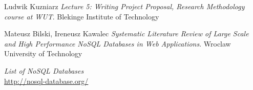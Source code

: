 \documentclass[times, 10pt,twocolumn]{article}
\newcounter{firstbib}
\begin{document}
\begin{thebibliography}{9}  

\setcounter{enumiv}{\value{firstbib}}
      
      Ludwik Kuzniarz
      \emph{Lecture 5: Writing Project Proposal, Research Methodology course at WUT}. Blekinge Institute of Technology
      
      Mateusz Bilski, Ireneusz Kawalec
      \emph{Systematic Literature Review of Large Scale and High Performance NoSQL Databases in Web Applications}. Wroclaw University of Technology
      
      \emph{List of NoSQL Databases} \\
      \url{http://nosql-database.org/}

\end{thebibliography}
\end{document}
